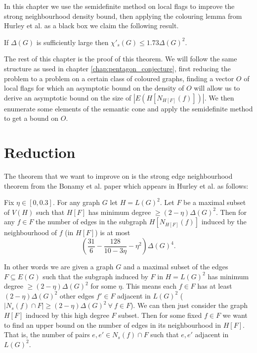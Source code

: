 In this chapter we use the semidefinite method on local flags to improve the strong
neighbourhood density bound, then applying the colouring lemma from Hurley et al. as a black
box we claim the following result.

\begin{theorem}
    \label{thm:strong_edge_colouring_bound}
    If $\Delta(G)$ is sufficiently large then $\chi'_s(G) \leq 1.73\Delta(G)^2$.
\end{theorem}

The rest of this chapter is the proof of this theorem.
We will follow the same structure as used in chapter \ref{chap:pentagon_conjecture},
first reducing the problem to a problem on a certain class of coloured graphs,
finding a vector $O$ of local flags for which an asymptotic bound on the density of $O$ will allow
us to derive an asymptotic bound on the size of $|E(H[N_{H[F]}(f)])|$.
We then enumerate some elements
of the semantic cone and apply the semidefinite method to get a bound on $O$.

\section{Reduction}

The theorem that we want to improve on is the strong edge neighbourhood theorem from
the Bonamy et al. paper which appears in Hurley et al. as follows:
\begin{knowntheorem}
    Fix $\eta \in [0, 0.3]$. For any graph $G$ let $H=L(G)^2$. Let $F$ be a
    maximal subset of $V(H)$ such that $H[F]$ has minimum degree
    $\geq (2-\eta)\Delta(G)^2$. Then for any $f\in F$ the number of edges in the subgraph
    $H[N_{H[F]}(f)]$ induced by the neighbourhood of $f$ (in $H[F]$) is at most
    \[
        \left(\frac{31}{6} - \frac{128}{10-3\eta} - \eta^2\right)\Delta(G)^4.
    \]
\end{knowntheorem}

In other words we are given a graph $G$ and a maximal subset of the edges $F \subseteq E(G)$
such that the subgraph induced by $F$ in $H=L(G)^2$ has minimum degree
$\geq (2-\eta)\Delta(G)^2$ for some $\eta$. This means each $f \in F$ has
at least $(2-\eta)\Delta(G)^2$ other edges $f' \in F$ adjacent in $L(G)^2$
($|N_s(f) \cap F| \geq (2-\eta)\Delta(G)^2\ \forall\ f \in F$).
We can then just consider the graph $H[F]$ induced by this high degree $F$ subset.
Then for some fixed $f \in F$ we want to find an upper bound on the number of edges
in its neighbourhood in $H[F]$. That is, the number of pairs $e, e' \in N_s(f) \cap F$ such
that $e, e'$ adjacent in $L(G)^2$.

